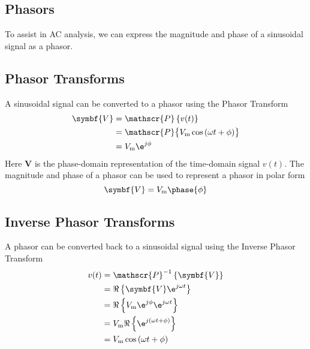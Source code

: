 \documentclass{article}
\begin{document}
\subsection{Phasors}
\begin{definition}
    To assist in AC analysis, we can express the magnitude and phase of a sinusoidal signal
    as a phasor.
\end{definition}
\subsection{Phasor Transforms}
\begin{definition}
    A sinusoidal signal can be converted to a phasor using the Phasor Transform
    \begin{align*}
        \symbf{V} & = \mathscr{P}\left\{ v(t) \right\}                                              \\
                  & = \mathscr{P}\bigl\{ V_{\mathrm{m}}\cos{\left( \omega t + \phi \right)} \bigr\} \\
                  & = V_{\mathrm{m}} \e^{j\phi}
    \end{align*}
    Here $\symbf{V}$ is the phase-domain representation of the
    time-domain signal $v(t)$.
    The magnitude and phase of a phasor can be used to represent a phasor in polar form
    \begin{equation*}
        \symbf{V} = V_{\mathrm{m}} \phase{\phi}
    \end{equation*}
\end{definition}
\subsection{Inverse Phasor Transforms}
\begin{definition}
    A phasor can be converted back to a sinusoidal signal using the Inverse Phasor Transform
    \begin{align*}
        v(t) & = \mathscr{P}^{-1}\left\{ \symbf{V} \right\}                             \\
             & = \Re\left\{ \symbf{V} \e^{j\omega t} \right\}                           \\
             & = \Re\left\{ V_{\mathrm{m}} \e^{j\phi} \e^{j\omega t} \right\}           \\
             & = V_{\mathrm{m}}\Re\left\{ \e^{j\left( \omega t + \phi \right)} \right\} \\
             & = V_{\mathrm{m}}\cos{\left( \omega t + \phi \right)}                     \\
    \end{align*}
\end{definition}
\end{document}

